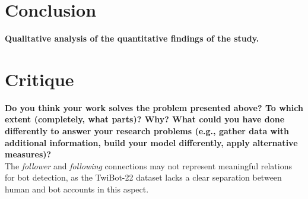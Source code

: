 \documentclass[12pt, a4paper]{article}
\begin{document}
\section{Conclusion}
	\label{conclusion}

	\textbf{Qualitative analysis of the quantitative findings of the study.}


\section{Critique}
	\label{critique}

	\textbf{Do you think your work solves the problem presented above? To which extent (completely, what parts)? Why? What could you have done differently to answer your research problems (e.g., gather data with additional information, build your model differently, apply alternative measures)?}\\

	The \textit{follower} and \textit{following} connections may not represent meaningful relations for bot detection, as the TwiBot-22 dataset lacks a clear separation between human and bot accounts in this aspect.




\end{document}
